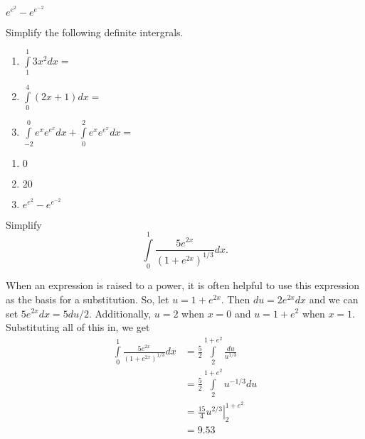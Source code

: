\documentclass[
]{article}
\begin{document}
\begin{answer}
$e^{e^2} - e^{e^{-2}}$
\end{answer}


\begin{exercise}
\protect\hypertarget{exr:unnamed-chunk-30}{}\label{exr:unnamed-chunk-30}

Simplify the following definite intergrals.

\begin{enumerate}
\def\labelenumi{\arabic{enumi}.}
\tightlist
\item
  \(\int\limits_1^1 3x^2 dx =\)
\item
  \(\int\limits_0^4 (2x+1)dx=\)
\item
  \(\int\limits_{-2}^0 e^x e^{e^x} dx + \int\limits_0^2 e^x e^{e^x} dx =\)
\end{enumerate}

\end{exercise}

\begin{answer}
\noindent
\begin{enumerate}
\item $0$
\item $20$
\item $e^{e^2} - e^{e^{-2}}$
\end{enumerate}
\end{answer}

\begin{example}
\protect\hypertarget{exm:intsub2}{}\label{exm:intsub2}Simplify \[\int\limits_0^1 \frac{5e^{2x}}{(1+e^{2x})^{1/3}}dx.\]
\end{example}

\begin{answer}
When an expression is raised to a power, it is often helpful to use this expression as the basis for a substitution.  So, let $u=1+e^{2x}$. Then $du=2e^{2x}dx$ and we can set $5e^{2x}dx=5du/2$.    Additionally, $u=2$ when $x=0$ and $u=1+e^2$ when $x=1$.  Substituting all of this in, we get
\begin{align*}
\int\limits_0^1 \frac{5e^{2x}}{(1+e^{2x})^{1/3}}dx
			&= \frac{5}{2}\int\limits_2^{1+e^2}\frac{du}{u^{1/3}}\\
			&= \frac{5}{2}\int\limits_2^{1+e^2} u^{-1/3}du\\
			&= \left. \frac{15}{4} u^{2/3} \right|_2^{1+e^2}\\
			&= 9.53
\end{align*}

\end{answer}
\end{document}
